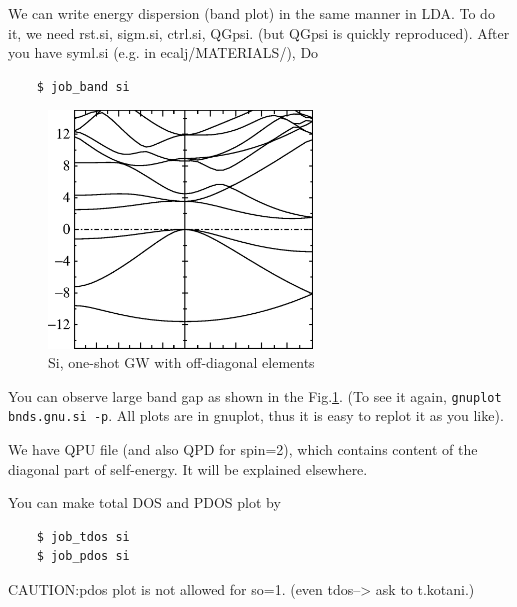 \documentclass[a4paper,10pt,epsf,fleqn]{article}
\begin{document}
We can write energy dispersion (band plot) in the same manner in LDA.
To do it, we need rst.si, sigm.si, ctrl.si, QGpsi.
(but QGpsi is quickly reproduced). After you have syml.si
(e.g. in ecalj/MATERIALS/), Do
\begin{verbatim}
    $ job_band si
\end{verbatim}

\begin{figure}[h]
 \begin{center}
  \includegraphics[width=70mm]{img/bandoneshotsi.eps}
  \caption{Si, one-shot GW with off-diagonal elements}
 \end{center}
\label{sigwscone}
\end{figure}
You can observe large band gap as shown in the Fig.\ref{sigwscone}.
(To see it again, \verb+gnuplot bnds.gnu.si -p+.
All plots are in gnuplot, thus it is easy to replot it as you like).

We have QPU file (and also QPD for spin=2), which contains content
of the diagonal part of self-energy. It will be explained elsewhere.

You can make total DOS and PDOS plot by 
\begin{verbatim}
    $ job_tdos si
    $ job_pdos si
\end{verbatim}
CAUTION:pdos plot is not allowed for so=1. (even tdos--> ask to t.kotani.)\\
\end{document}
